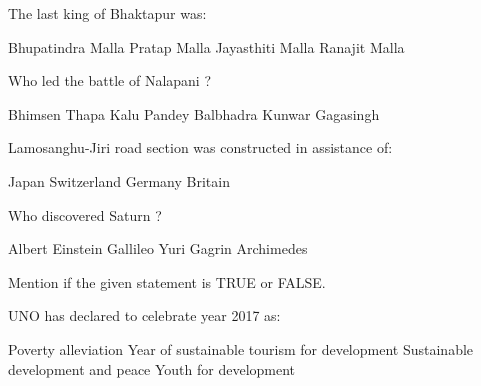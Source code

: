 \begin{questions}
\question The last king of Bhaktapur was:
  \begin{choices}
  \choice Bhupatindra Malla
  \choice Pratap Malla
  \choice Jayasthiti Malla
  \choice Ranajit Malla
  \end{choices}

\question Who led the battle of Nalapani ?
  \begin{choices}
  \choice Bhimsen Thapa
  \choice Kalu Pandey
  \choice Balbhadra Kunwar
  \choice Gagasingh
  \end{choices}

\question Lamosanghu-Jiri road section was constructed in assistance of:
  \begin{choices}
  \choice Japan
  \choice Switzerland
  \choice Germany
  \choice Britain
  \end{choices}

\question Who discovered Saturn ?
  \begin{choices}
  \choice Albert Einstein
  \choice Gallileo
  \choice Yuri Gagrin
  \choice Archimedes
  \end{choices}

\question Mention if the given statement is TRUE or FALSE.

\question UNO has declared to celebrate year 2017 as:
  \begin{choices}
  \choice Poverty alleviation
  \choice Year of sustainable tourism for development
  \choice Sustainable development and peace
  \choice Youth for development
  \end{choices}


\end{questions}

